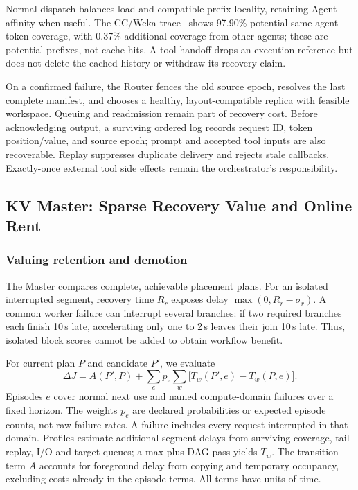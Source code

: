 Normal dispatch balances load and compatible prefix locality, retaining
Agent affinity when useful. The CC/Weka trace~\cite{semianalysis2026cctraces}
shows 97.90\% potential same-agent token coverage, with 0.37\% additional
coverage from other agents; these are potential prefixes, not cache hits. A tool handoff drops
an execution reference but does not delete the cached history or withdraw
its recovery claim.



On a confirmed failure, the Router fences the old source epoch, resolves
the last complete manifest, and chooses a healthy, layout-compatible
replica with feasible workspace. Queuing and readmission remain part of
recovery cost. Before acknowledging output, a surviving ordered log
records request ID, token position/value, and source epoch; prompt and
accepted tool inputs are also recoverable. Replay suppresses duplicate
delivery and rejects stale callbacks. Exactly-once external tool side
effects remain the orchestrator's responsibility.

\subsection{KV Master: Sparse Recovery Value and Online Rent}
\label{sec:kv-master}

\subsubsection{Valuing retention and demotion}
\label{sec:placement-value}

The Master compares complete, achievable placement plans. For an isolated
interrupted segment, recovery time $R_r$ exposes delay
$\max(0,R_r-\sigma_r)$. A common worker failure can interrupt several
branches: if two required branches each finish 10\,s late, accelerating
only one to 2\,s leaves their join 10\,s late. Thus, isolated block scores
cannot be added to obtain workflow benefit.

For current plan $P$ and candidate $P'$, we evaluate
\begin{equation}
 \Delta J=A(P',P)+\sum_e p_e\sum_w
       \bigl[T_w(P',e)-T_w(P,e)\bigr].
 \label{eq:value}
\end{equation}
Episodes $e$ cover normal next use and named compute-domain failures over
a fixed horizon. The weights $p_e$ are declared probabilities or expected
episode counts, not raw failure rates. A failure includes every request
interrupted in that domain. Profiles estimate additional segment delays
from surviving coverage, tail replay, I/O and target queues; a max-plus
DAG pass yields $T_w$. The transition term $A$ accounts for foreground
delay from copying and temporary occupancy, excluding costs already in
the episode terms. All terms have units of time.


